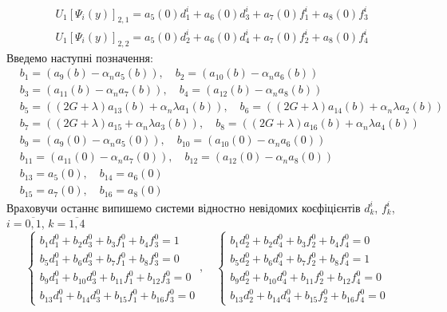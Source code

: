 \begin{align*}
    &U_1\left[ \Psi_i(y) \right]_{2,1} = a_5(0) d_1^i + a_6(0) d_3^i + a_7(0) f_1^i + a_8(0) f_3^i 
\end{align*}
\begin{align*}
    &U_1\left[ \Psi_i(y) \right]_{2,2} = a_5(0) d_2^i + a_6(0) d_4^i + a_7(0) f_2^i + a_8(0) f_4^i 
\end{align*}
Введемо наступні позначення:
\begin{align*}
    &b_1 = (a_9(b) - \alpha_n a_5(b)), \quad b_2 = (a_{10}(b) - \alpha_n a_6(b)) \\
    &b_3 = (a_{11}(b) - \alpha_n a_7(b)), \quad b_4 = (a_{12}(b) - \alpha_n a_8(b)) \\
    &b_5 = ((2G + \lambda) a_{13}(b) + \alpha_n \lambda a_1(b)), \quad b_6 = ((2G + \lambda) a_{14}(b) + \alpha_n \lambda a_2(b)) \\
    &b_7 = ((2G + \lambda)a_{15} + \alpha_n \lambda a_3(b)), \quad b_8 = ((2G + \lambda)a_{16}(b) + \alpha_n \lambda a_4(b)) \\
    &b_9 = (a_9(0) - \alpha_n a_5(0)), \quad b_{10} = (a_{10}(0) - \alpha_n a_6(0)) \\
    &b_{11} = (a_{11}(0) - \alpha_n a_7(0)), \quad b_{12} = (a_{12}(0) - \alpha_n a_8(0)) \\
    &b_{13} = a_5(0), \quad b_{14} = a_6(0) \\
    &b_{15} = a_7(0), \quad b_{16} = a_8(0)
\end{align*}
Враховучи останнє випишемо системи відностно невідомих коєфіцієнтів $d_k^i$, $f_k^i$, $i=\overline{0,1}$, $k=\overline{1,4}$
\begin{equation*}
    \begin{cases}
        b_1 d_1^0 + b_2 d_3^0 + b_3 f_1^0 + b_4 f_3^0 = 1 \\
        b_5 d_1^0 + b_6 d_3^0 + b_7 f_1^0 + b_8 f_3^0 = 0 \\
        b_9 d_1^0 + b_{10} d_3^0 + b_{11} f_1^0 + b_{12} f_3^0 = 0 \\
        b_{13} d_1^0 + b_{14} d_3^0 + b_{15} f_1^0 + b_{16} f_3^0 = 0
    \end{cases}, \quad
    \begin{cases}
        b_1 d_2^0 + b_2 d_4^0 + b_3 f_2^0 + b_4 f_4^0 = 0 \\
        b_5 d_2^0 + b_6 d_4^0 + b_7 f_2^0 + b_8 f_4^0 = 1 \\
        b_9 d_2^0 + b_{10} d_4^0 + b_{11} f_2^0 + b_{12} f_4^0 = 0 \\
        b_{13} d_2^0 + b_{14} d_4^0 + b_{15} f_2^0 + b_{16} f_4^0 = 0
    \end{cases}
\end{equation*}
